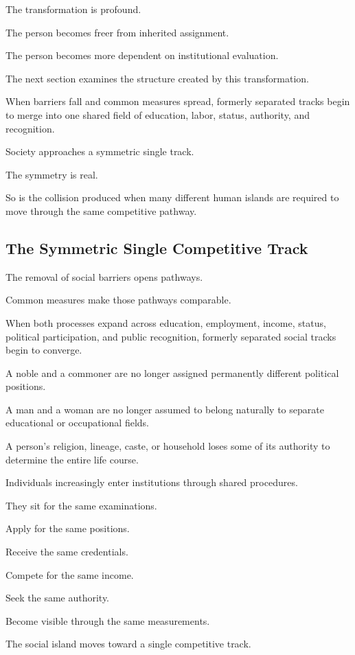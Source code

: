 The transformation is profound.

The person becomes freer from inherited assignment.

The person becomes more dependent on institutional evaluation.

The next section examines the structure created by this transformation.

When barriers fall and common measures spread, formerly separated tracks begin to merge into one shared field of education, labor, status, authority, and recognition.

Society approaches a symmetric single track.

The symmetry is real.

So is the collision produced when many different human islands are required to move through the same competitive pathway.

\subsection*{\textbf{The Symmetric Single Competitive Track}}


The removal of social barriers opens pathways.

Common measures make those pathways comparable.

When both processes expand across education, employment, income, status, political participation, and public recognition, formerly separated social tracks begin to converge.

A noble and a commoner are no longer assigned permanently different political positions.

A man and a woman are no longer assumed to belong naturally to separate educational or occupational fields.

A person’s religion, lineage, caste, or household loses some of its authority to determine the entire life course.

Individuals increasingly enter institutions through shared procedures.

They sit for the same examinations.

Apply for the same positions.

Receive the same credentials.

Compete for the same income.

Seek the same authority.

Become visible through the same measurements.

The social island moves toward a single competitive track.

